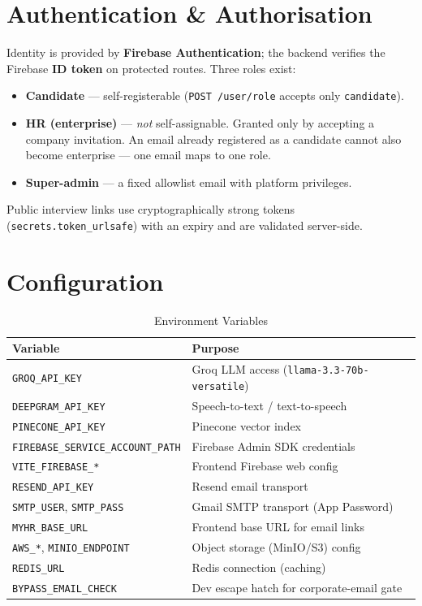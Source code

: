 \documentclass[12pt,a4paper,oneside]{report}
\begin{document}
\section{Authentication \& Authorisation}

Identity is provided by \textbf{Firebase Authentication}; the backend verifies the Firebase
\textbf{ID token} on protected routes. Three roles exist:

\begin{itemize}
  \item \textbf{Candidate} --- self-registerable (\texttt{POST /user/role} accepts only
    \texttt{candidate}).
  \item \textbf{HR (enterprise)} --- \textit{not} self-assignable. Granted only by accepting a
    company invitation. An email already registered as a candidate cannot also become enterprise
    --- one email maps to one role.
  \item \textbf{Super-admin} --- a fixed allowlist email with platform privileges.
\end{itemize}

Public interview links use cryptographically strong tokens (\texttt{secrets.token\_urlsafe})
with an expiry and are validated server-side.

\section{Configuration}

\begin{table}[H]
\centering
\caption{Environment Variables}
\label{tab:envvars}
\begin{tabularx}{\textwidth}{L{5.5cm}X}
\toprule
\textbf{Variable} & \textbf{Purpose} \\
\midrule
\texttt{GROQ\_API\_KEY}                  & Groq LLM access (\texttt{llama-3.3-70b-versatile}) \\
\texttt{DEEPGRAM\_API\_KEY}              & Speech-to-text / text-to-speech \\
\texttt{PINECONE\_API\_KEY}              & Pinecone vector index \\
\texttt{FIREBASE\_SERVICE\_ACCOUNT\_PATH} & Firebase Admin SDK credentials \\
\texttt{VITE\_FIREBASE\_*}               & Frontend Firebase web config \\
\texttt{RESEND\_API\_KEY}                & Resend email transport \\
\texttt{SMTP\_USER}, \texttt{SMTP\_PASS} & Gmail SMTP transport (App Password) \\
\texttt{MYHR\_BASE\_URL}                 & Frontend base URL for email links \\
\texttt{AWS\_*}, \texttt{MINIO\_ENDPOINT} & Object storage (MinIO/S3) config \\
\texttt{REDIS\_URL}                      & Redis connection (caching) \\
\texttt{BYPASS\_EMAIL\_CHECK}            & Dev escape hatch for corporate-email gate \\
\bottomrule
\end{tabularx}
\end{table}
\end{document}
